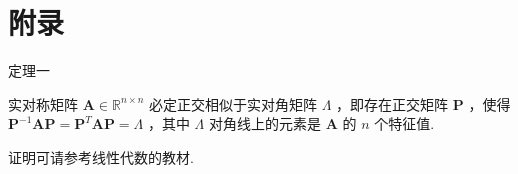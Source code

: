 \documentclass[UTF8]{ctexart}
\begin{document}
    

    
    
    
    \section{附录}
    定理一
    
    实对称矩阵 $ \boldsymbol{A} \in \mathbb{R}^{n \times n} $ 必定正交相似于实对角矩阵 $ \boldsymbol{\varLambda} $ ，即存在正交矩阵 $ \boldsymbol{P} $ ，使得 $ \boldsymbol{P}^{-1} \boldsymbol{A} \boldsymbol{P} = \boldsymbol{P}^T \boldsymbol{A} \boldsymbol{P} = \boldsymbol{\varLambda} $ ，其中 $ \boldsymbol{\varLambda} $ 对角线上的元素是 $ \boldsymbol{A} $ 的 $ n $ 个特征值.
    
    证明可请参考线性代数的教材.
    
	
	
	
%	
	
\end{document}
